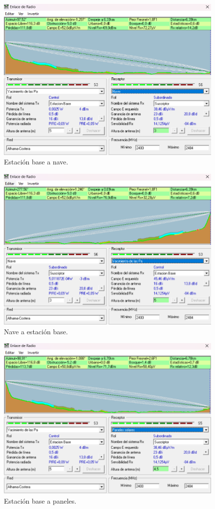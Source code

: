 \documentclass{article}
\begin{document}
\begin{figure}[ht]
    \centering
    \includegraphics[width=0.8\linewidth]{src/EstacionBase-Nave.png}
    \caption{\label{fig:ebasenave} Estación base a nave.}
\end{figure}
\newpage

\begin{figure}[ht]
    \centering
    \includegraphics[width=0.8\linewidth]{src/Nave-EstacionBase.png}
    \caption{\label{fig:naveebase} Nave a estación base.}
\end{figure}

\begin{figure}[ht]
    \centering
    \includegraphics[width=0.8\linewidth]{src/EstacionBase-Paneles.png}
    \caption{\label{fig:ebasepaneles} Estación base a paneles.}
\end{figure}
\end{document}

